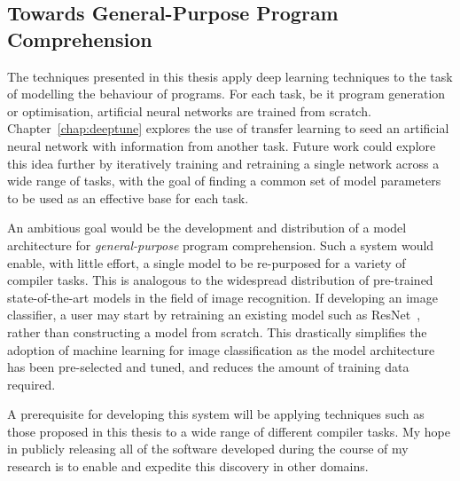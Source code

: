 \subsection{Towards General-Purpose Program Comprehension}

The techniques presented in this thesis apply deep learning techniques to the task of modelling the behaviour of programs. For each task, be it program generation or optimisation, artificial neural networks are trained from scratch. Chapter~\ref{chap:deeptune} explores the use of transfer learning to seed an artificial neural network with information from another task. Future work could explore this idea further by iteratively training and retraining a single network across a wide range of tasks, with the goal of finding a common set of model parameters to be used as an effective base for each task.

An ambitious goal would be the development and distribution of a model architecture for \emph{general-purpose} program comprehension. Such a system would enable, with little effort, a single model to be re-purposed for a variety of compiler tasks. This is analogous to the widespread distribution of pre-trained state-of-the-art models in the field of image recognition. If developing an image classifier, a user may start by retraining an existing model such as ResNet~\cite{He2016}, rather than constructing a model from scratch. This drastically simplifies the adoption of machine learning for image classification as the model architecture has been pre-selected and tuned, and reduces the amount of training data required.

A prerequisite for developing this system will be applying techniques such as those proposed in this thesis to a wide range of different compiler tasks. My hope in publicly releasing all of the software developed during the course of my research is to enable and expedite this discovery in other domains.



